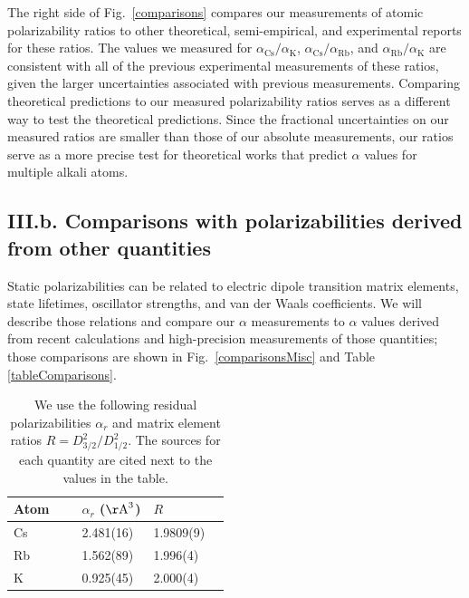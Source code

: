 \documentclass[twocolumn,pra,showpacs,superscriptaddress,longbibliography]{revtex4-1}   %
\newcommand{\figref}[1]{Fig.~\ref{#1}}
\newcommand{\ak}{\alpha_{\textrm{K}}}
\newcommand{\arb}{\alpha_{\textrm{Rb}}}
\newcommand{\acs}{\alpha_{\textrm{Cs}}}
\newcommand{\AAA}{\mathrm{\AA}}
\begin{document}
The right side of \figref{comparisons} compares our measurements of atomic polarizability ratios to other theoretical, semi-empirical, and experimental reports for these ratios.  The values we measured for $\acs/\ak$, $\acs/\arb$, and $\arb/\ak$ are consistent with all of the previous experimental measurements of these ratios, given the larger uncertainties associated with previous measurements.  Comparing theoretical predictions to our measured polarizability ratios serves as a different way to test the theoretical predictions.  Since the fractional uncertainties on our measured ratios are smaller than those of our absolute measurements, our ratios serve as a more precise test for theoretical works that predict $\alpha$ values for multiple alkali atoms.  




\subsection{III.b. Comparisons with polarizabilities derived from other quantities}

Static polarizabilities can be related to electric dipole transition matrix elements, state lifetimes, oscillator strengths, and van der Waals coefficients. We will describe those relations and compare our $\alpha$ measurements to $\alpha$ values derived from recent calculations and high-precision measurements of those quantities; those comparisons are shown in \figref{comparisonsMisc} and Table \ref{tableComparisons}.

\begingroup
\begin{table}
\caption{\label{tableOmegaRes}We use the following residual polarizabilities $\alpha_r$ and matrix element ratios $R = D_{3/2}^2/D_{1/2}^2$.
The sources for each quantity are cited next to the values in the table.}
\begin{center}
\begin{tabular}{llll}
\hline\hline
Atom$\quad$~ & $\alpha_r$ ($\AAA^3$) \quad\quad\quad\quad\quad & $R$ \\
\hline
Cs & 2.481(16) \cite{Derevianko2001} & 1.9809(9) & \cite{Rafac1998} \\
Rb & 1.562(89) \cite{Safronova2006} & 1.996(4) & \cite{Volz2006} \\ %
K  & 0.925(45) \cite{Safronova2006} & 2.000(4) & \cite{Holmgren2012} \\
\hline\hline
\end{tabular}
\end{center}
\end{table}
\endgroup
\end{document}
